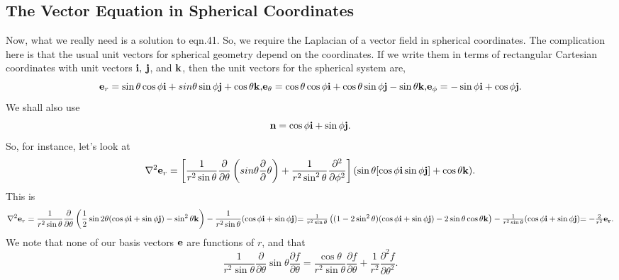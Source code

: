 \subsection{The Vector Equation in Spherical Coordinates}
Now, what we really need is a solution to eqn.41. So, we require the Laplacian of a vector field in spherical coordinates. The complication here is that the usual unit vectors for spherical geometry depend on the coordinates. If we write them in terms of rectangular Cartesian coordinates with unit vectors ${\bf i}, \>
 {\bf j}$,  and $\bf k$, then the unit vectors for the spherical system are,
\begin{equation}
{\bf e}_r= \sin \theta \cos \phi {\bf i}
+ sin \theta \sin \phi {\bf j} +\cos \theta {\bf k},
$$    $$
{\bf e}_\theta= \cos  \theta \cos \phi {\bf i}
+ \cos  \theta \sin \phi {\bf j} -\sin  \theta {\bf k},
$$   $$
{\bf e}_\phi= -\sin \phi {\bf i}
+  \cos \phi {\bf j}. 
\end{equation}
We shall also use 
\begin{equation}
{ \bf n}= \cos \phi {\bf i}
+  \sin \phi {\bf j}. 
\end{equation}
So, for instance, let's look at
\begin{equation}
\nabla^2 {\bf e}_r
=
\left \lbrack \frac{1}{r^2 \sin \theta} \frac{\partial }{\partial \theta}
\left ( sin \theta \frac{\partial }\partial \theta \right )
+\frac{1}{r^2 \sin^2 \theta} \frac{\partial^2 } {\partial \phi^2}
\right \rbrack 
( \sin \theta [\cos \phi {\bf i}
  \sin \phi {\bf j} ] +\cos \theta {\bf k} ). 
\end{equation}
This is  
\begin{equation}
\nabla^2 {\bf e}_r=\frac{1}{r^2 \sin \theta}
 \frac{\partial }{\partial \theta} 
\left ( \frac{1}{2} \sin 2 \theta (\cos \phi {\bf i}+\sin \phi {\bf j} )
 -\sin^2 \theta {\bf k} \right )
-\frac{1}{r^2 \sin \theta }( \cos \phi {\bf i}+\sin \phi {\bf j} )
$$    $$
=\frac{1}{r^2 \sin \theta}
\left ( (1 - 2 \sin^2 \theta) (\cos \phi {\bf i}+\sin \phi {\bf j} )
-2 \sin \theta \cos \theta {\bf k} \right )
-\frac{1}{r^2 \sin \theta }( \cos \phi { \bf i}+\sin \phi {\bf j} )
$$   $$
=-\frac{2}{r^2} {\bf e_r}.
\end{equation}
We note that none of our basis vectors ${\bf e}$ are functions of $r$, and 
that
\begin{equation}
\frac{1}{r^2 \sin \theta} \frac{\partial }{\partial \theta}
\sin \theta \frac{\partial f }{\partial \theta}
=\frac{\cos \theta}{r^2 \sin \theta}
\frac{\partial f }{\partial \theta}+\frac{1}{r^2}
\frac{\partial^2 f} {\partial \theta^2}.
\end{equation}

